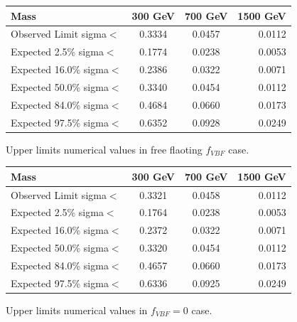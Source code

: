 \begin{center}
  \begin{tabular}{ l | c |c| r }
    \hline
    Mass                    & 300 GeV & 700 GeV  &  1500 GeV                 \\ \hline     
    Observed Limit  sigma$<$&  0.3334& 0.0457   & 0.0112                    \\\hline
    Expected  2.5\% sigma$<$&  0.1774& 0.0238   & 0.0053                   \\\hline
    Expected 16.0\% sigma$<$&  0.2386& 0.0322   & 0.0071                   \\\hline
    Expected 50.0\% sigma$<$&  0.3340& 0.0454   & 0.0112                   \\\hline
    Expected 84.0\% sigma$<$&  0.4684& 0.0660   & 0.0173                   \\\hline
    Expected 97.5\% sigma$<$&  0.6352& 0.0928   & 0.0249                   \\\hline
    
    \hline
  \end{tabular}

\caption{Upper limits numerical values in free flaoting $f_{VBF}$ case.}
    \label{tab:UL_ff}
\end{center}




\begin{center}
  \begin{tabular}{ l | c |c| r }
    \hline
    Mass                    & 300 GeV & 700 GeV  &  1500 GeV                 \\ \hline     
    Observed Limit  sigma$<$&0.3321  & 0.0458   & 0.0112                    \\\hline
    Expected  2.5\% sigma$<$&0.1764  & 0.0238   & 0.0053                   \\\hline
    Expected 16.0\% sigma$<$&0.2372  & 0.0322   & 0.0071                   \\\hline
    Expected 50.0\% sigma$<$&0.3320  & 0.0454   & 0.0112                   \\\hline
    Expected 84.0\% sigma$<$&0.4657  & 0.0660   & 0.0173                   \\\hline
    Expected 97.5\% sigma$<$&0.6336  & 0.0925   & 0.0249                   \\\hline
    
    \hline
  \end{tabular}

\caption{Upper limits numerical values in $f_{VBF}=0$ case.}
    \label{tab:UL_f0}
\end{center}





